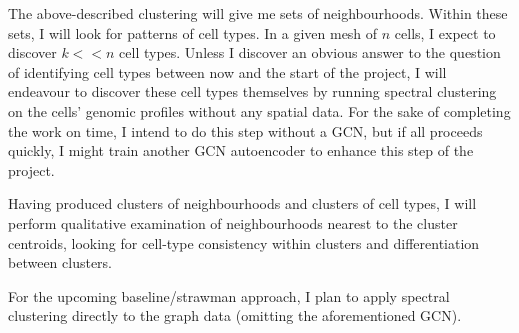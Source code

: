 \documentclass{article}
\begin{document}
The above-described clustering will give me sets of neighbourhoods. Within these sets, I will look for patterns of cell types. In a given mesh of $n$ cells, I expect to discover $k << n$ cell types. Unless I discover an obvious answer to the question of identifying cell types between now and the start of the project, I will endeavour to discover these cell types themselves by running spectral clustering on the cells' genomic profiles without any spatial data. For the sake of completing the work on time, I intend to do this step without a GCN, but if all proceeds quickly, I might train another GCN autoencoder to enhance this step of the project.

Having produced clusters of neighbourhoods and clusters of cell types, I will perform qualitative examination of neighbourhoods nearest to the cluster centroids, looking for cell-type consistency within clusters and differentiation between clusters.

For the upcoming baseline/strawman approach, I plan to apply spectral clustering directly to the graph data (omitting the aforementioned GCN).
\end{document}
